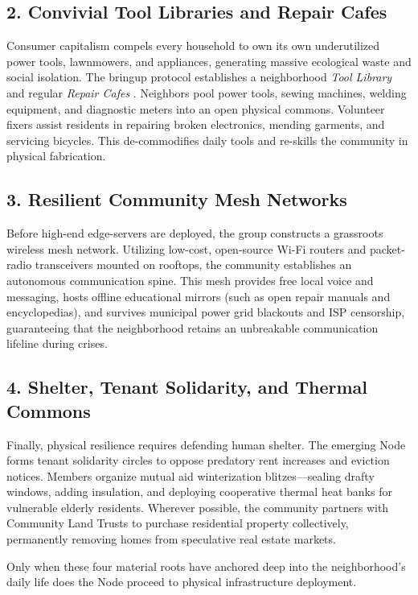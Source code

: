 \subsection{2. Convivial Tool Libraries and Repair Cafes}
Consumer capitalism compels every household to own its own underutilized power tools, lawnmowers, and appliances, generating massive ecological waste and social isolation. 
The bringup protocol establishes a neighborhood \textit{Tool Library} and regular \textit{Repair Cafes} \parencite{illich1973}. Neighbors pool power tools, sewing machines, welding equipment, and diagnostic meters into an open physical commons. Volunteer fixers assist residents in repairing broken electronics, mending garments, and servicing bicycles. This de-commodifies daily tools and re-skills the community in physical fabrication.

\subsection{3. Resilient Community Mesh Networks}
Before high-end edge-servers are deployed, the group constructs a grassroots wireless mesh network. Utilizing low-cost, open-source Wi-Fi routers and packet-radio transceivers mounted on rooftops, the community establishes an autonomous communication spine. This mesh provides free local voice and messaging, hosts offline educational mirrors (such as open repair manuals and encyclopedias), and survives municipal power grid blackouts and ISP censorship, guaranteeing that the neighborhood retains an unbreakable communication lifeline during crises.

\subsection{4. Shelter, Tenant Solidarity, and Thermal Commons}
Finally, physical resilience requires defending human shelter. The emerging Node forms tenant solidarity circles to oppose predatory rent increases and eviction notices. Members organize mutual aid winterization blitzes---sealing drafty windows, adding insulation, and deploying cooperative thermal heat banks for vulnerable elderly residents. Wherever possible, the community partners with Community Land Trusts to purchase residential property collectively, permanently removing homes from speculative real estate markets.

Only when these four material roots have anchored deep into the neighborhood's daily life does the Node proceed to physical infrastructure deployment.


